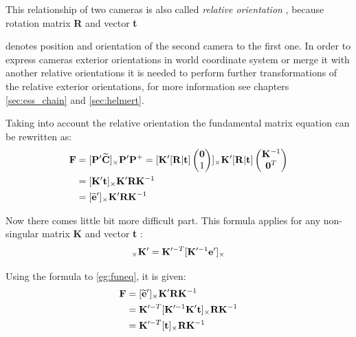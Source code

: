 \documentclass[a4paper,12pt]{article}
\newcommand{\ematr}[1]{
{\bf #1}
}
\newcommand{\evect}[1]{
{\bf #1}
}
\newcommand{\ehvect}[1]{
{\bf \widetilde{#1}}
}
\newcommand{\term}[1]{
{\it #1}
}
\begin{document}
This relationship of two cameras is also called \term{relative orientation}, because rotation matrix \ematr{R} and vector \evect{t}
denotes position and orientation of the second camera to the first one. In order to express cameras exterior orientations in world coordinate 
system or merge it with another relative orientations it is needed to perform further transformations of the relative 
exterior orientations, for more information see chapters \ref{sec:ess_chain} and \ref{sec:helmert}.

Taking into account the relative orientation the fundamental matrix equation can be rewritten as:
\begin{equation}
\label{eg:funeq}
\begin{split}
\ematr{F}  &= [\ematr{P}'\ehvect{C}]_{\times} \ematr{P}'\ematr{P}^{+}
= [\ematr{K}' [\ematr{R}|\evect{t}]
\begin{pmatrix}
   \evect{0} \\
    1 \\
\end{pmatrix}]
_{\times} 
\ematr{K}' [\ematr{R}|\evect{t}]  
\begin{pmatrix}
   \evect{K}^{-1} \\
   \evect{0}^{T} \\
\end{pmatrix} \\
&= [\ematr{K}' \evect{t}]_{\times} \ematr{K}'\ematr{R}\ematr{K}^{-1} \\
&= [\ehvect{e}']_{\times} \ematr{K}'\ematr{R}\ematr{K}^{-1} 
\end{split}
\end{equation}

Now there comes little bit more difficult part.
This formula applies for any non-singular matrix \ematr{K} and vector \evect{t}:
\begin{equation}
[\evect{e}']_{\times} \ematr{K'} = \ematr{K}'^{-T}[\ematr{K}'^{-1}\evect{e}']_{\times}
\end{equation}

Using the formula to \eqref{eg:funeq}, it is given:  
\begin{equation}
\begin{split}
\ematr{F}  &= [\ehvect{e}']_{\times} \ematr{K}' \ematr{R} \ematr{K}^{-1} \\
	   &= \ematr{K}'^{-T} [\ematr{K}'^{-1} \ematr{K}' \evect{t}]_{\times} \ematr{R} \ematr{K}^{-1} \\
	   &= \ematr{K}'^{-T} [\evect{t}]_{\times} \ematr{R} \ematr{K}^{-1}
\end{split}
\end{equation}
\end{document}
